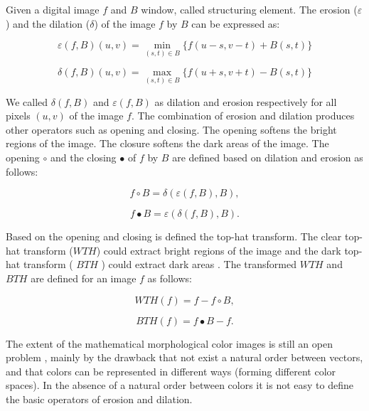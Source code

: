 Given a digital image $f$ and $B$ window, called structuring element. The erosion ($\varepsilon$) and the dilation ($\delta$) of the image $f$ by $B$ can be expressed as:

\begin{equation}
\varepsilon(f,B)(u,v)  = \min_{(s,t) \in B} \{f(u-s,v-t) + B(s,t) \}
\end{equation}

\begin{equation}
\delta(f,B)(u,v)  =  \max_{(s,t) \in B} \{f(u+s,v+t) - B(s,t) \}
\end{equation}

We called $\delta(f,B)$ and $\varepsilon(f,B)$ as dilation and erosion respectively for all pixels $(u,v)$ of the image $f$. The combination of erosion and dilation produces other operators such as opening and closing. The opening softens the bright regions of the image. The closure softens the dark areas of the image. The opening $\circ$ and the closing $\bullet$ of $f$ by $B$ are defined based on dilation and erosion as follows:

\begin{equation}
f\circ B = \delta(\varepsilon(f,B),B),
\end{equation}

\begin{equation}
f\bullet B = \varepsilon(\delta(f,B),B).
\end{equation}

Based on the opening and closing is defined the top-hat transform. The clear top-hat transform ($WTH$) could extract bright regions of the image and the dark top-hat transform ( $BTH$ )
could extract dark areas . The transformed $WTH$ and $BTH$ are defined for an image $f$ as follows:

\begin{equation}
WTH(f) = f - f\circ B,
\end{equation}

\begin{equation}
BTH(f) = f\bullet B - f. 
\end{equation}

The extent of the mathematical morphological color images is still an open problem \cite{aptoula2007pseudo}, mainly by the drawback that not exist a natural order between vectors, and that colors can be represented in different ways (forming different color spaces). In the absence of a natural order between colors it is not easy to define the basic operators of erosion and dilation.  

